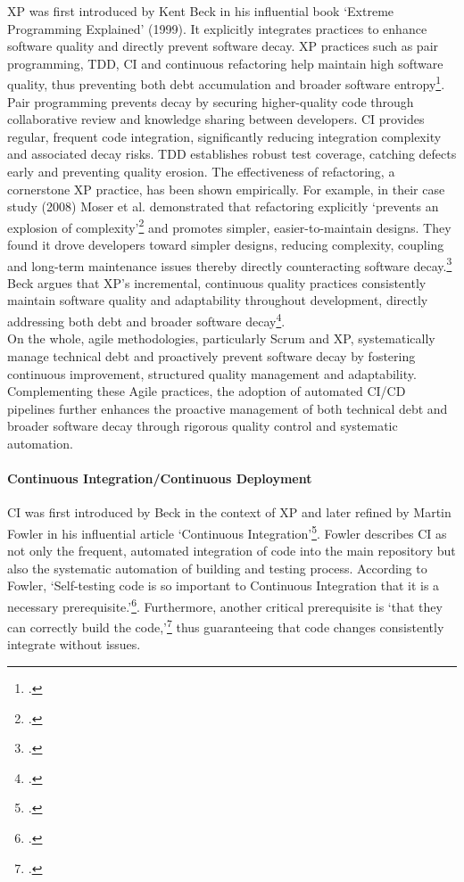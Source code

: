 \ac{XP} was first introduced by Kent Beck in his influential book `Extreme Programming Explained' (1999).
It explicitly integrates practices to enhance software quality and directly prevent software decay.
\ac{XP} practices such as pair programming, \ac{TDD}, \ac{CI} and continuous refactoring help maintain high software quality, thus preventing both debt accumulation
and broader software entropy\footcite[5-6]{beckExtremeProgrammingExplained1999}.
Pair programming prevents decay by securing higher-quality code through collaborative review and knowledge sharing between developers.
\ac{CI} provides regular, frequent code integration, significantly reducing integration complexity and associated decay risks.
\ac{TDD} establishes robust test coverage, catching defects early and preventing quality erosion.
The effectiveness of refactoring, a cornerstone XP practice, has been shown empirically. For example, in their case study (2008) Moser et al.
demonstrated that refactoring explicitly `prevents an explosion of complexity'\footcite[262]{moserCaseStudyImpact2008}
and promotes simpler, easier-to-maintain designs.
They found it drove developers toward simpler designs, reducing complexity, coupling and long-term maintenance issues thereby directly counteracting software decay.\footcite[262]{moserCaseStudyImpact2008}
Beck argues that \ac{XP}'s incremental, continuous quality practices consistently maintain software quality and adaptability throughout development, directly addressing both debt and broader software decay\footcite[5-7]{beckExtremeProgrammingExplained1999}.\\
On the whole, agile methodologies, particularly Scrum and \ac{XP}, systematically manage technical debt and proactively prevent software decay by fostering continuous improvement, structured quality management and adaptability.
Complementing these Agile practices, the adoption of automated \ac{CI/CD} pipelines further enhances the proactive management of both technical debt
and broader software decay through rigorous quality control and systematic automation.\\

\paragraph{Continuous Integration/Continuous Deployment}
\ac{CI} was first introduced by Beck in the context of \ac{XP} and later refined by Martin Fowler in his influential article `Continuous Integration'\footcite{fowlerContinuousIntegration2006}.
Fowler describes \ac{CI} as not only the frequent, automated integration of code into the main repository but also the systematic automation of building and testing process.
According to Fowler, `Self-testing code is so important to Continuous Integration that it is a necessary prerequisite.'\footcite{fowlerContinuousIntegration2006}.
Furthermore, another critical prerequisite is `that they can correctly build the code,'\footcite{fowlerContinuousIntegration2006} thus guaranteeing that code changes consistently
integrate without issues.\\

